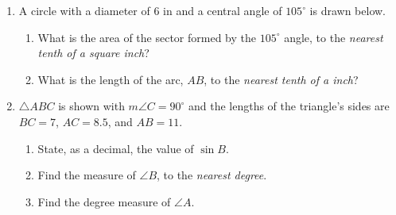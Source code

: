 \documentclass[12pt, twoside]{article}
\begin{document}
\begin{enumerate}
  \item A circle with a diameter of 6 in and a central angle of $105^\circ$ is drawn below.
     \begin{enumerate}
       \item What is the area of the sector formed by the $105^\circ$ angle, to the \emph{nearest tenth of a square inch}?\\[0.25cm]
        \vspace{1cm}
       \item What is the length of the arc, $AB$, to the \emph{nearest tenth of a inch}?
     \end{enumerate}

\newpage

  \item $\triangle ABC$ is shown with $m\angle C=90^\circ$ and the lengths of the triangle's sides are $BC=7$, $AC=8.5$, and $AB=11$.
  \begin{multicols}{2}
        \begin{enumerate}
        \item State, as a decimal, the value of $\sin B$. \vspace{1.25cm}
        \item Find the measure of $\angle B$, to the \emph{nearest degree}. \vspace{1.25cm}
        \item Find the degree measure of $\angle A$.
      \end{enumerate}
    \end{multicols}
    \vspace{1.5cm}


\end{enumerate}
\end{document}
